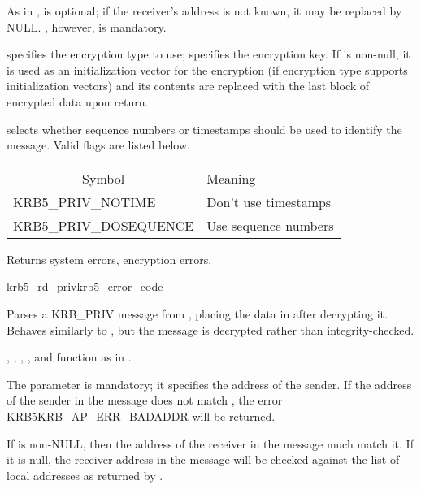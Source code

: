 As in ,  is optional; if
the receiver's address is not known, it may be replaced by NULL.
, however, is mandatory.

 specifies the encryption type to use;
 specifies the encryption key.  If 
is non-null, it is used as an initialization vector for the encryption
(if encryption type  supports initialization vectors)
and its contents are replaced with the last block of encrypted data
upon return.

 selects whether sequence numbers or timestamps
should be used to identify the message.  Valid flags are listed below.

\begin{tabular}{ll}
\multicolumn{1}{c}{Symbol} & Meaning \\
KRB5_PRIV_NOTIME		& Don't use timestamps \\
KRB5_PRIV_DOSEQUENCE	& Use sequence numbers \\
\end{tabular}

Returns system errors, encryption errors.

\begin{funcdecl}{krb5_rd_priv}{krb5_error_code}{\funcin}
\funcinout
{}
\funcout
{}
\end{funcdecl}

Parses a KRB_PRIV message from , placing the data in
 after decrypting it.  Behaves similarly to
, but the message is decrypted rather than
integrity-checked.

, , ,
,  and 
function as in .


The  parameter is mandatory;  it
specifies the address of the sender.  If the address of the sender in
the message does not match , the error
KRB5KRB_AP_ERR_BADADDR will be returned.

If  is non-NULL, then the address of the receiver
in the message much match it.  If it is null, the receiver address in
the message will be checked against the list of local addresses as
returned by .

